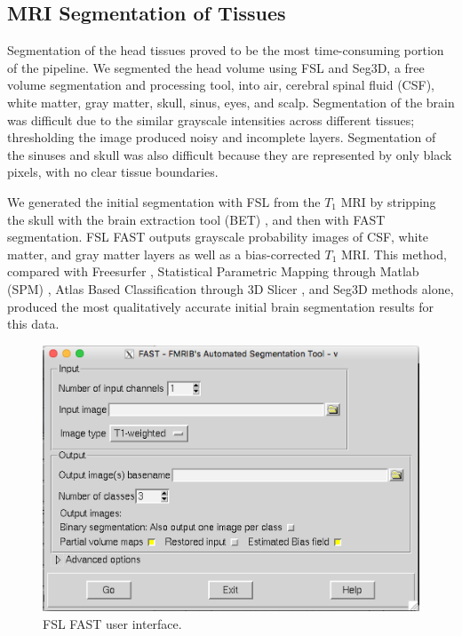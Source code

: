 \subsection{MRI Segmentation of Tissues}
\label{sec:Seg}


Segmentation of the head tissues proved to be the most time-consuming portion of the pipeline. We segmented the head volume using FSL and Seg3D, a free volume segmentation and processing tool, \cite{ref:seg3d} into air, cerebral spinal fluid (CSF), white matter, gray matter, skull, sinus, eyes, and scalp. Segmentation of the brain was difficult due to the similar grayscale intensities across different tissues; thresholding the image produced noisy and incomplete layers. Segmentation of the sinuses and skull was also difficult because they are represented by only black pixels, with no clear tissue boundaries.

We generated the initial segmentation with FSL from the $T_1$ MRI by stripping the skull with the brain extraction tool (BET) \cite{ref:bet1}, and then with FAST segmentation. FSL FAST outputs grayscale probability images of CSF, white matter, and gray matter layers as well as a bias-corrected $T_1$ MRI. This method, compared with Freesurfer \cite{ref:freesurf}, Statistical Parametric Mapping through Matlab (SPM) \cite{ref:spm}, Atlas Based Classification through 3D Slicer \cite{ref:abc}, and Seg3D methods alone, produced the most qualitatively accurate initial brain segmentation results for this data.

\begin{figure}[H]
    \centering
    \includegraphics[width=.8\textwidth]{Figures/FSL_FAST}
    \caption{FSL FAST user interface.}
    \label{fig:fslfast}
\end{figure}

